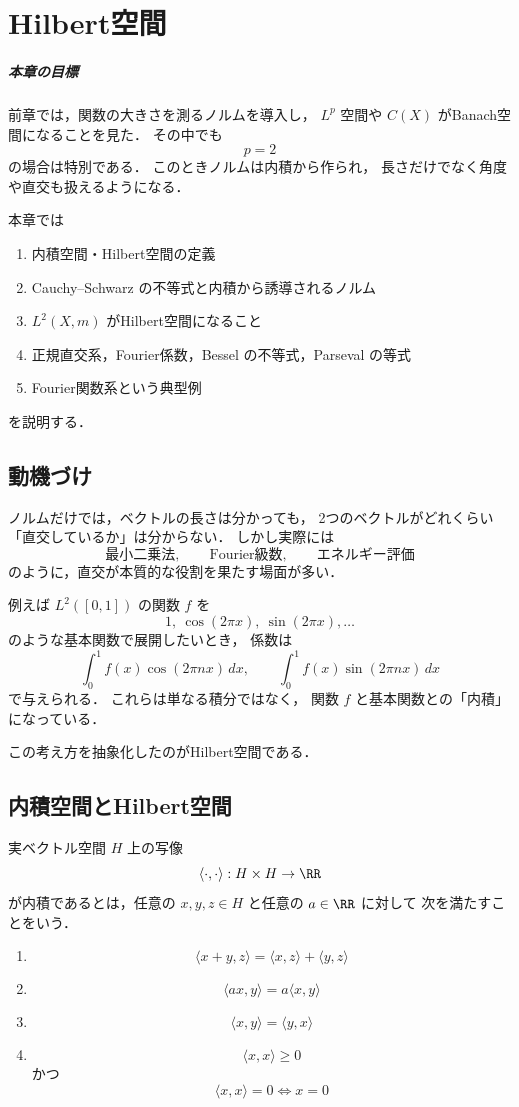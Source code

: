 \chapter{Hilbert空間}

\paragraph{本章の目標}
前章では，関数の大きさを測るノルムを導入し，
$L^p$ 空間や $C(X)$ がBanach空間になることを見た．
その中でも
\[
p=2
\]
の場合は特別である．
このときノルムは内積から作られ，
長さだけでなく角度や直交も扱えるようになる．

本章では
\begin{enumerate}
    \item 内積空間・Hilbert空間の定義
    \item Cauchy--Schwarz の不等式と内積から誘導されるノルム
    \item $L^2(X,m)$ がHilbert空間になること
    \item 正規直交系，Fourier係数，Bessel の不等式，Parseval の等式
    \item Fourier関数系という典型例
\end{enumerate}
を説明する．

\section{動機づけ}

ノルムだけでは，ベクトルの長さは分かっても，
2つのベクトルがどれくらい「直交しているか」は分からない．
しかし実際には
\[
\text{最小二乗法},\qquad
\text{Fourier級数},\qquad
\text{エネルギー評価}
\]
のように，直交が本質的な役割を果たす場面が多い．

例えば $L^2([0,1])$ の関数 $f$ を
\[
1,\ \cos(2\pi x),\ \sin(2\pi x),\dots
\]
のような基本関数で展開したいとき，
係数は
\[
\int_0^1 f(x)\cos(2\pi nx)\,dx,
\qquad
\int_0^1 f(x)\sin(2\pi nx)\,dx
\]
で与えられる．
これらは単なる積分ではなく，
関数 $f$ と基本関数との「内積」になっている．

この考え方を抽象化したのがHilbert空間である．

\section{内積空間とHilbert空間}

\begin{definition}[内積]
実ベクトル空間 $H$ 上の写像
\[
\langle \cdot,\cdot\rangle:H\times H\to\RR
\]
が内積であるとは，任意の $x,y,z\in H$ と任意の $a\in\RR$ に対して
次を満たすことをいう．
\begin{enumerate}
    \item
    \[
    \langle x+ y,z\rangle=\langle x,z\rangle+\langle y,z\rangle
    \]
    \item
    \[
    \langle ax,y\rangle=a\langle x,y\rangle
    \]
    \item
    \[
    \langle x,y\rangle=\langle y,x\rangle
    \]
    \item
    \[
    \langle x,x\rangle\ge 0
    \]
    かつ
    \[
    \langle x,x\rangle=0 \iff x=0
    \]
\end{enumerate}
\end{definition}

